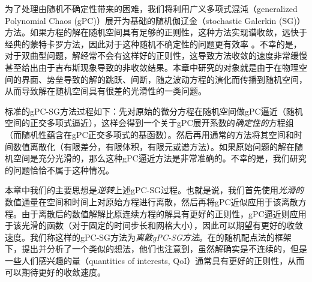 为了处理由随机不确定性带来的困难，我们将利用广义多项式混沌（generalized Polynomial Chaos (gPC)）展开为基础的随机伽辽金（stochastic Galerkin (SG)）方法。如果方程的解在随机空间具有足够的正则性，这种方法实现谱收敛，远快于经典的蒙特卡罗方法，因此对于这种随机不确定性的问题更有效率
。不幸的是，对于双曲型问题，解经常不会有这样好的正则性，这导致方法收敛的速度非常缓慢甚至给出由于吉布斯现象导致的非收敛结果。本章中研究的对象就是由于在物理空间的界面、势垒导致的解的跳跃、间断，随之波动方程的演化而传播到随机空间，从而导致解在随机空间具有很差的光滑性的一类问题。


标准的gPC-SG方法过程如下：先对原始的微分方程在随机空间做gPC逼近（随机空间的正交多项式逼近），这样会得到一个关于gPC展开系数的{\it 确定性的}方程组（而随机性蕴含在gPC正交多项式的基函数）。然后再用通常的方法将其空间和时间数值离散化（有限差分，有限体积，有限元或谱方法）。如果原始问题的解在随机空间是充分光滑的，那么这种gPC逼近方法是非常准确的。不幸的是，我们研究的问题恰恰不属于这种情况。


本章中我们的主要思想是{\it 逆转}上述gPC-SG过程。也就是说，我们首先使用{\it 光滑的}数值通量在空间和时间上对原始方程进行离散，然后再将gPC近似应用于该离散方程。由于离散后的数值解解比原连续方程的解具有更好的正则性，gPC逼近则应用于该光滑的函数（对于固定的时间步长和网格大小），因此可以期望有更好的收敛速度。我们称这样的gPC-SG方法为{\it 离散gPC-SG方法}。在的随机配点法的框架下，提出并分析了一个类似的想法，他们也注意到，虽然解确实是不连续的，但是一些人们感兴趣的量（quantities of interests, QoI）通常具有更好的正则性，从而可以期待更好的收敛速度。

